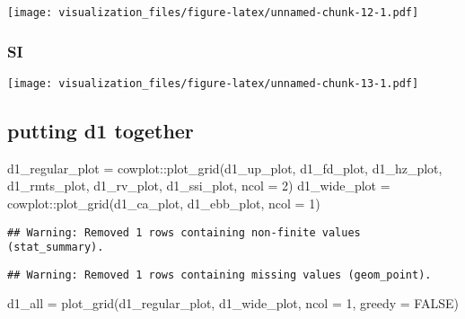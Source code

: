 \documentclass[
]{article}
\newenvironment{Shaded}{\begin{snugshade}}{\end{snugshade}}
\newcommand{\AttributeTok}[1]{\textcolor[rgb]{0.77,0.63,0.00}{#1}}
\newcommand{\ConstantTok}[1]{\textcolor[rgb]{0.00,0.00,0.00}{#1}}
\newcommand{\DecValTok}[1]{\textcolor[rgb]{0.00,0.00,0.81}{#1}}
\newcommand{\FunctionTok}[1]{\textcolor[rgb]{0.00,0.00,0.00}{#1}}
\newcommand{\NormalTok}[1]{#1}
\newcommand{\OtherTok}[1]{\textcolor[rgb]{0.56,0.35,0.01}{#1}}
\newcommand{\SpecialCharTok}[1]{\textcolor[rgb]{0.00,0.00,0.00}{#1}}
\newcommand{\StringTok}[1]{\textcolor[rgb]{0.31,0.60,0.02}{#1}}
\begin{document}
\texttt{[image: visualization\_files/figure-latex/unnamed-chunk-12-1.pdf]}

\hypertarget{si}{%
\subsubsection{SI}\label{si}}

\begin{Shaded}
\end{Shaded}

\texttt{[image: visualization\_files/figure-latex/unnamed-chunk-13-1.pdf]}

\hypertarget{putting-d1-together}{%
\subsection{putting d1 together}\label{putting-d1-together}}

\begin{Shaded}
\begin{Highlighting}[]
\NormalTok{d1\_regular\_plot }\OtherTok{=}\NormalTok{ cowplot}\SpecialCharTok{::}\FunctionTok{plot\_grid}\NormalTok{(d1\_up\_plot, d1\_fd\_plot, d1\_hz\_plot, d1\_rmts\_plot, d1\_rv\_plot, d1\_ssi\_plot, }\AttributeTok{ncol =} \DecValTok{2}\NormalTok{)}
\NormalTok{d1\_wide\_plot }\OtherTok{=}\NormalTok{ cowplot}\SpecialCharTok{::}\FunctionTok{plot\_grid}\NormalTok{(d1\_ca\_plot, d1\_ebb\_plot, }\AttributeTok{ncol =} \DecValTok{1}\NormalTok{)}
\end{Highlighting}
\end{Shaded}

\begin{verbatim}
## Warning: Removed 1 rows containing non-finite values (stat_summary).
\end{verbatim}

\begin{verbatim}
## Warning: Removed 1 rows containing missing values (geom_point).
\end{verbatim}

\begin{Shaded}
\begin{Highlighting}[]
\NormalTok{d1\_all }\OtherTok{=} \FunctionTok{plot\_grid}\NormalTok{(d1\_regular\_plot, d1\_wide\_plot, }\AttributeTok{ncol =} \DecValTok{1}\NormalTok{, }\AttributeTok{greedy =} \ConstantTok{FALSE}\NormalTok{)}
\end{Highlighting}
\end{Shaded}
\end{document}
